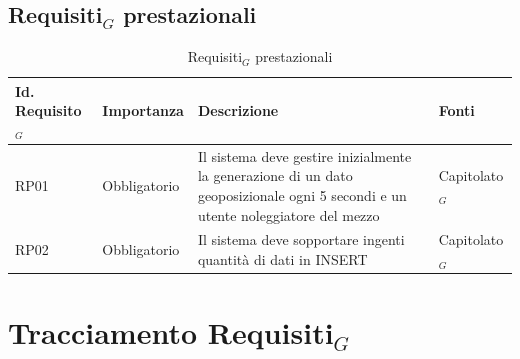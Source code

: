 \documentclass[11pt]{article}
\begin{document}
\begin{justify}
\subsection{Requisiti$_G$ prestazionali}

\begin{table}[H]
\centering
\renewcommand{\arraystretch}{1.5}
\begin{tabular}{|>{\centering\arraybackslash}m{2.7cm}|>{\centering\arraybackslash}m{2.7cm}|>{\centering\arraybackslash}m{6cm}|>{\centering\arraybackslash}m{2.1cm}|}
\hline
\textbf{Id. Requisito$_G$} & \textbf{Importanza} & \textbf{Descrizione} & \textbf{Fonti}\\
\hline
RP01 & Obbligatorio &  Il sistema deve gestire inizialmente la generazione di un dato geoposizionale ogni 5 secondi e un utente noleggiatore del mezzo & Capitolato$_G$\\
\hline
RP02 & Obbligatorio &  Il sistema deve sopportare ingenti quantità di dati in INSERT & Capitolato$_G$\\
\hline
\end{tabular}
\caption{Requisiti$_G$ prestazionali}
\end{table}



\newpage
\section{Tracciamento Requisiti$_G$}


\end{justify}
\end{document}
